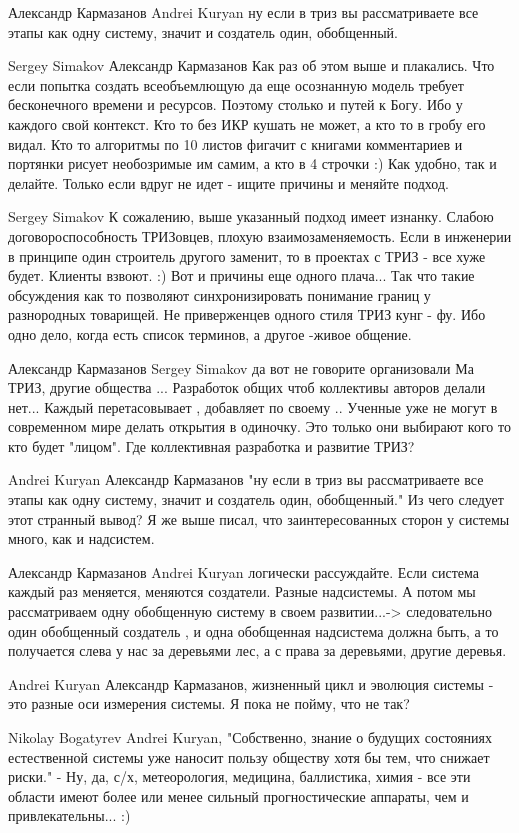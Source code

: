 \documentclass[11pt,a4paper]{article}
\begin{document}
Александр Кармазанов Andrei Kuryan ну если в триз вы рассматриваете все этапы
как одну систему, значит и создатель один, обобщенный.

Sergey Simakov Александр Кармазанов Как раз об этом выше и плакались. Что если
попытка создать всеобъемлющую да еще осознанную модель требует бесконечного
времени и ресурсов.  Поэтому столько и путей к Богу. Ибо у каждого свой
контекст. Кто то без ИКР кушать не может, а кто то в гробу его видал. Кто то
алгоритмы по 10 листов фигачит с книгами комментариев и портянки рисует
необозримые им самим, а кто в 4 строчки :) Как удобно, так и делайте. Только
если вдруг не идет - ищите причины и меняйте подход.

Sergey Simakov К сожалению, выше указанный подход имеет изнанку. Слабою
договороспособность ТРИЗовцев, плохую взаимозаменяемость.  Если в инженерии в
принципе один строитель другого заменит, то в проектах с ТРИЗ - все хуже
будет. Клиенты взвоют. :) Вот и причины еще одного плача...  Так что такие
обсуждения как то позволяют синхронизировать понимание границ у разнородных
товарищей. Не приверженцев одного стиля ТРИЗ кунг - фу. Ибо одно дело, когда
есть список терминов, а другое -живое общение.

Александр Кармазанов Sergey Simakov да вот не говорите организовали Ма ТРИЗ,
другие общества ... Разработок общих чтоб коллективы авторов делали нет...
Каждый перетасовывает , добавляет по своему ..  Ученные уже не могут в
современном мире делать открытия в одиночку. Это только они выбирают кого то
кто будет "лицом". Где коллективная разработка и развитие ТРИЗ?

Andrei Kuryan Александр Кармазанов "ну если в триз вы рассматриваете все этапы
как одну систему, значит и создатель один, обобщенный."  Из чего следует этот
странный вывод? Я же выше писал, что заинтересованных сторон у системы много,
как и надсистем.

Александр Кармазанов Andrei Kuryan логически рассуждайте. Если система каждый
раз меняется, меняются создатели. Разные надсистемы. А потом мы рассматриваем
одну обобщенную систему в своем развитии...-> следовательно один обобщенный
создатель , и одна обобщенная надсистема должна быть, а то получается слева у
нас за деревьями лес, а с права за деревьями, другие деревья.

Andrei Kuryan Александр Кармазанов, жизненный цикл и эволюция системы - это
разные оси измерения системы. Я пока не пойму, что не так?

Nikolay Bogatyrev Andrei Kuryan, "Собственно, знание о будущих состояниях
естественной системы уже наносит пользу обществу хотя бы тем, что снижает
риски." - Ну, да, с/х, метеорология, медицина, баллистика, химия - все эти
области имеют более или менее сильный прогностические аппараты, чем и
привлекательны... :)
\end{document}
